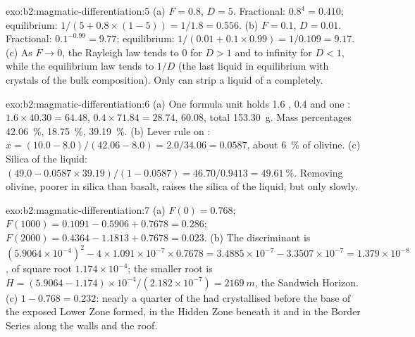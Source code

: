 \begin{solution}{exo:b2:magmatic-differentiation:5}
(a) $F = 0.8$, $D = 5$. Fractional: $0.8^{4} = 0.410$; equilibrium:
$1/(5 + 0.8\times(1 - 5)) = 1/1.8 = 0.556$. (b) $F = 0.1$, $D = 0.01$. Fractional:
$0.1^{-0.99} = 9.77$; equilibrium: $1/(0.01 + 0.1\times0.99) = 1/0.109 = 9.17$.
(c) As $F \to 0$, the Rayleigh law tends to $0$ for $D > 1$ and to infinity for
$D < 1$, while the equilibrium law tends to $1/D$ (the last liquid in equilibrium
with crystals of the bulk composition). Only  can strip a
liquid of a  completely.
\end{solution}

\begin{solution}{exo:b2:magmatic-differentiation:6}
(a) One formula unit holds 1.6 , 0.4  and one : $1.6\times
40.30 = 64.48$, $0.4\times71.84 = 28.74$, 60.08, total \qty{153.30}{g}. Mass
percentages  \qty{42.06}{\percent},  \qty{18.75}{\percent},
 \qty{39.19}{\percent}. (b) Lever rule on : $x = (10.0 - 8.0)/(42.06
- 8.0) = 2.0/34.06 = 0.0587$, about \qty{6}{\percent} of olivine. (c) Silica of the
liquid: $(49.0 - 0.0587\times39.19)/(1 - 0.0587) = 46.70/0.9413 =
\qty{49.61}{\percent}$. Removing olivine, poorer in silica than basalt, raises the
silica of the liquid, but only slowly.
\end{solution}

\begin{solution}{exo:b2:magmatic-differentiation:7}
(a) $F(0) = 0.768$; $F(1000) = 0.1091 - 0.5906 + 0.7678 = 0.286$; $F(2000) = 0.4364
- 1.1813 + 0.7678 = 0.023$. (b) The discriminant is $(5.9064\times10^{-4})^2 -
4\times1.091\times10^{-7}\times0.7678 = 3.4885\times10^{-7} - 3.3507\times10^{-7} =
1.379\times10^{-8}$, of square root $1.174\times10^{-4}$; the smaller root is
$H = (5.9064 - 1.174)\times10^{-4}/(2.182\times10^{-7}) = \qty{2169}{m}$, the
Sandwich Horizon. (c) $1 - 0.768 = 0.232$: nearly a quarter of the  had
crystallised before the base of the exposed Lower Zone formed, in the Hidden Zone
beneath it and in the Border Series along the walls and the roof.
\end{solution}

